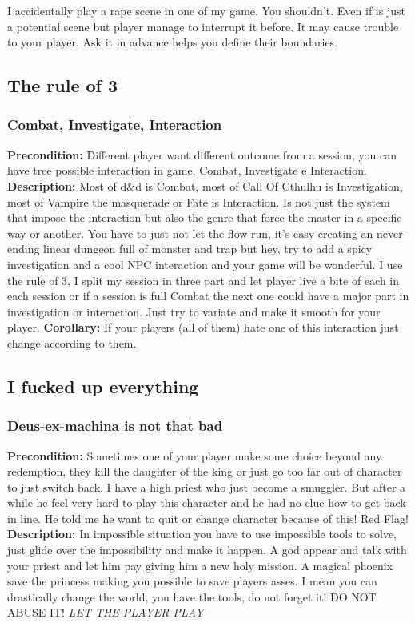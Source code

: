 \documentclass[letterpaper,10pt,twoside,twocolumn,openany]{book}
\begin{document}
\begin{quotebox}
	I accidentally play a rape scene in one of my game. You shouldn't. Even if is just a potential scene but player manage to interrupt it before. It may cause trouble to your player. Ask it in advance helps you define their boundaries. 
\end{quotebox}

\subsection{The rule of 3}
\subsubsection{Combat, Investigate, Interaction}
\textbf{Precondition:} Different player want different outcome from a session, you can have tree possible interaction in game, Combat, Investigate e Interaction. 
\newline
\noindent
\textbf{Description:} Most of d\&d is Combat, most of Call Of Cthulhu is Investigation, most of Vampire the masquerade or Fate is Interaction. Is not just the system that impose the interaction but also the genre that force the master in a specific way or another. You have to just not let the flow run, it's easy creating an never-ending linear dungeon full of monster and trap but hey, try to add a spicy investigation and a cool NPC interaction and your game will be wonderful.
I use the rule of 3, I split my session in three part and let player live a bite of each in each session or if a session is full Combat the next one could have a major part in investigation or interaction. Just try to variate and make it smooth for your player. 
\textbf{Corollary:} If your players (all of them) hate one of this interaction just change according to them. 

\subsection{I fucked up everything}
\subsubsection{Deus-ex-machina is not that bad}
\textbf{Precondition:} Sometimes one of your player make some choice beyond any redemption, they kill the daughter of the king or just go too far out of character to just switch back. I have a high priest who just become a smuggler. But after a while he feel very hard to play this character and he had no clue how to get back in line. He told me he want to quit or change character because of this! Red Flag!  
\newline
\noindent
\textbf{Description:} In impossible situation you have to use impossible tools to solve, just glide over the impossibility and make it happen. A god appear and talk with your priest and let him pay giving him a new holy mission. A magical phoenix save the princess making you possible to save players asses. I mean you can drastically change the world, you have the tools, do not forget it! DO NOT ABUSE IT! \textit{LET THE PLAYER PLAY}
\end{document}
